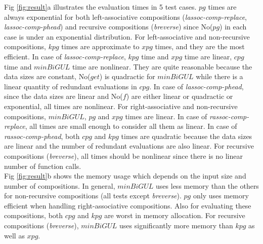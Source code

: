 

Fig \ref{fig:result}a illustrates the evaluation times in 5 test cases. $pg$ times are always exponential for both left-associative compositions (\textit{lassoc-comp-replace}, \textit{lassoc-comp-phead}) and recursive compositions (\textit{breverse}) since No($pg$) in each case is under an exponential distribution. For left-associative and non-recursive compositions, $kpg$ times are approximate to $xpg$ times, and they are the most efficient. In case of \textit{lassoc-comp-replace}, $kpg$ time and $xpg$ time are linear, $cpg$ time and $minBiGUL$ time are nonlinear. They are quite reasonable because the data sizes are constant, No($get$) is quadractic for $minBiGUL$ while there is a linear quantity of redundant evaluations in $cpg$. In case of \textit{lassoc-comp-phead}, since the data sizes are linear and No($f$) are either linear or quadractic or exponential, all times are nonlinear. For right-associative and non-recursive compositions, $minBiGUL$, $pg$ and $xpg$ times are linear. In case of \textit{rassoc-comp-replace}, all times are small enough to consider all them as linear. In case of \textit{rassoc-comp-phead}, both $cpg$ and $kpg$ times are quadratic because the data sizes are linear and the number of redundant evaluations are also linear. For recursive compositions (\textit{breverse}), all times should be nonlinear since there is no linear number of function calls.\\
Fig \ref{fig:result}b shows the memory usage which depends on the input size and number of compositions. In general, $minBiGUL$ uses less memory than the others for non-recursive compositions (all tests except \textit{breverse}). $pg$ only uses memory efficient when handling right-associative compositions. Also for evaluating these  compositions, both $cpg$ and $kpg$ are worst in memory allocation. For recursive compositions (\textit{breverse}), $minBiGUL$ uses significantly more memory than $kpg$ as well as $xpg$.